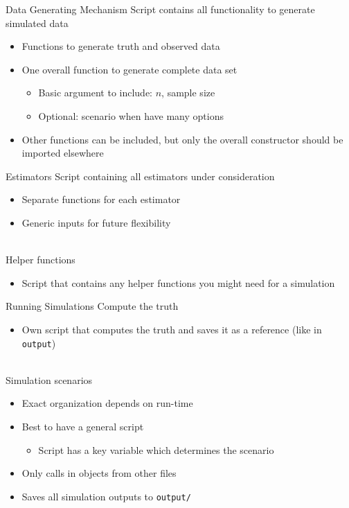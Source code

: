 \documentclass[aspectratio=169]{beamer}
\begin{document}
\begin{frame}{Data Generating Mechanism}
	Script contains all functionality to generate simulated data
	\begin{itemize}
		\item Functions to generate truth and observed data
		\item One overall function to generate complete data set
		\begin{itemize}
			\item Basic argument to include: $n$, sample size
			\item Optional: scenario when have many options
		\end{itemize}
		\item Other functions can be included, but only the overall constructor should be imported elsewhere
	\end{itemize}
\end{frame}

\begin{frame}{Estimators}
	Script containing all estimators under consideration
	\begin{itemize}
		\item Separate functions for each estimator
		\item Generic inputs for future flexibility
	\end{itemize}
	~\\
	Helper functions
	\begin{itemize}
		\item Script that contains any helper functions you might need for a simulation
	\end{itemize}
\end{frame}

\begin{frame}{Running Simulations}
	Compute the truth
	\begin{itemize}
		\item Own script that computes the truth and saves it as a reference (like in \texttt{output})
	\end{itemize}
	~\\
	Simulation scenarios
	\begin{itemize}
		\item Exact organization depends on run-time
		\item Best to have a general script
		\begin{itemize}
			\item Script has a key variable which determines the scenario
		\end{itemize}
		\item Only calls in objects from other files
		\item Saves all simulation outputs to \texttt{output/}
	\end{itemize}
\end{frame}
\end{document}
